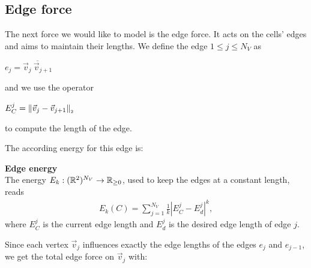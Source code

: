 \subsection{Edge force}
The next force we would like to model is the edge force. 
It acts on the cells' edges and aims to maintain their lengths.
We define the edge $1 \leq j \leq N_V$ as 
\begin{center}
	$
	e_j = \overline{\vec{v}_j \: \vec{v}_{j+1}}
	$
\end{center}
and we use the operator 
\begin{center}
	$
	E^j_C = \norm[\vec{v}_j - \vec{v}_{j+1}]
	$
\end{center}
to compute the length of the edge. 

The according energy for this edge is:
\begin{definition} \textbf{Edge energy} \\
	The energy $E_k: (\mathbb{R}^2)^{N_V} \rightarrow \mathbb{R}_{\geq 0}$, used to keep the edges at a constant length, reads 
	\begin{align}
		E_k(C) =  \sum\limits_{j=1}^{N_V} \frac{1}{k} |E^j_{C} - E^{j}_d|^k, \label{eq:edgeEnergy} 
	\end{align}
	where $E^j_{C}$ is the current edge length and $E^{j}_d$ is the desired edge length of edge $j$. 
\end{definition}

Since each vertex $\vec{v}_j$ influences exactly the edge lengths of the edges $e_{j}$ and $e_{j-1}$, we get the total edge force on $\vec{v}_j$ with: 

